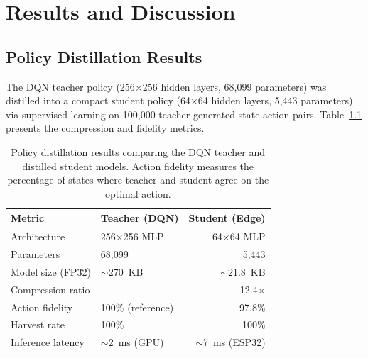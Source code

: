 
\chapter{Results and Discussion}
    \label{ch:Results}



\section{Policy Distillation Results}
    \label{sec:Distillation Results}

    The DQN teacher policy (256$\times$256 hidden layers, 68,099 parameters) was distilled into a compact student policy (64$\times$64 hidden layers, 5,443 parameters) via supervised learning on 100,000 teacher-generated state-action pairs. Table~\ref{tab:distill_results} presents the compression and fidelity metrics.

    \begin{table}[ht]
        \caption{Policy distillation results comparing the DQN teacher and distilled student models. Action fidelity measures the percentage of states where teacher and student agree on the optimal action.}
        \label{tab:distill_results}
        \centering
        \begin{tabular}{llr}
            \hline
            \textbf{Metric} & \textbf{Teacher (DQN)} & \textbf{Student (Edge)} \\
            \hline
            Architecture & 256$\times$256 MLP & 64$\times$64 MLP \\
            Parameters & 68,099 & 5,443 \\
            Model size (FP32) & $\sim$270~KB & $\sim$21.8~KB \\
            Compression ratio & --- & 12.4$\times$ \\
            Action fidelity & 100\% (reference) & 97.8\% \\
            Harvest rate & 100\% & 100\% \\
            Inference latency & $\sim$2~ms (GPU) & $\sim$7~ms (ESP32) \\
            \hline
        \end{tabular}
    \end{table}

